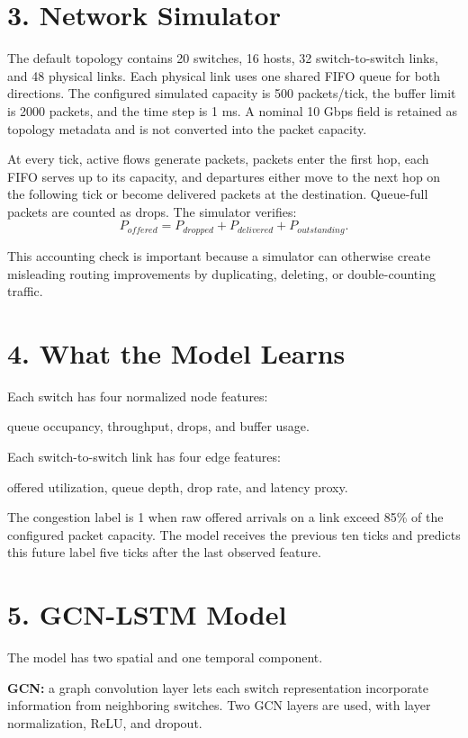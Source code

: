 \documentclass[11pt]{article}
\begin{document}
\section*{3. Network Simulator}
The default topology contains 20 switches, 16 hosts, 32 switch-to-switch links, and 48 physical links. Each physical link uses one shared FIFO queue for both directions. The configured simulated capacity is 500 packets/tick, the buffer limit is 2000 packets, and the time step is 1 ms. A nominal 10 Gbps field is retained as topology metadata and is not converted into the packet capacity.

At every tick, active flows generate packets, packets enter the first hop, each FIFO serves up to its capacity, and departures either move to the next hop on the following tick or become delivered packets at the destination. Queue-full packets are counted as drops. The simulator verifies:
\[
P_{offered}=P_{dropped}+P_{delivered}+P_{outstanding}.
\]

This accounting check is important because a simulator can otherwise create misleading routing improvements by duplicating, deleting, or double-counting traffic.

\section*{4. What the Model Learns}
Each switch has four normalized node features:
\begin{center}
queue occupancy, throughput, drops, and buffer usage.
\end{center}
Each switch-to-switch link has four edge features:
\begin{center}
offered utilization, queue depth, drop rate, and latency proxy.
\end{center}

The congestion label is 1 when raw offered arrivals on a link exceed 85\% of the configured packet capacity. The model receives the previous ten ticks and predicts this future label five ticks after the last observed feature.

\section*{5. GCN-LSTM Model}
The model has two spatial and one temporal component.

\textbf{GCN:} a graph convolution layer lets each switch representation incorporate information from neighboring switches. Two GCN layers are used, with layer normalization, ReLU, and dropout.
\end{document}
